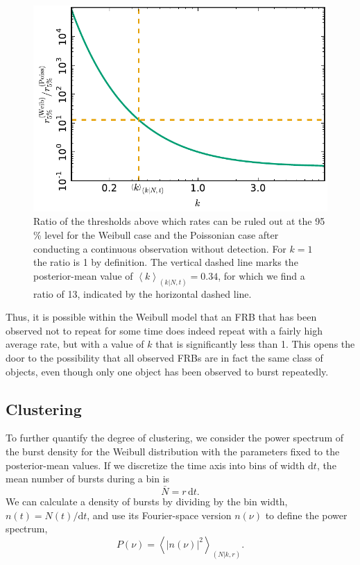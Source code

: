 \documentclass[fleqn,usenatbib]{mnras}
\newcommand{\new}[1]{#1}
\begin{document}
\begin{figure}
	\includegraphics[width=1.0\columnwidth]{rule_out_rate.pdf}
	\caption{\label{fig:ruleout}\new{Ratio of the thresholds above which rates can be ruled out at the 95\,\% level for the Weibull case and the Poissonian case after conducting a continuous observation without detection. For $k = 1$ the ratio is 1 by definition. The vertical dashed line marks the posterior-mean value of $\left<k\right>_{(k|N,t)}=0.34$, for which we find a ratio of 13, indicated by the horizontal dashed line.}}
\end{figure}

\new{Thus, it is possible within the Weibull model that an FRB that has been observed not to repeat for some time does indeed repeat with a fairly high average rate, but with a value of $k$ that is significantly less than 1. This opens the door to the possibility that all observed FRBs are in fact the same class of objects, even though only one object has been observed to burst repeatedly.}


\subsection{Clustering}
\label{sec:clustering}

\new{To further quantify the degree of clustering, we consider the power spectrum of the burst density for the Weibull distribution with the parameters fixed to the posterior-mean values. If we discretize the time axis into bins of width $\mathrm{d}t$, the mean number of bursts during a bin is
\begin{equation}
	\bar{N} = r\,\mathrm{d}t.
\end{equation}
We can calculate a density of bursts by dividing by the bin width, $n(t) = N(t)/\mathrm{d}t$, and use its Fourier-space version $n(\nu)$ to define the power spectrum,
\begin{equation}
	P(\nu) = \left< \left|n(\nu)\right|^2 \right>_{(N|k,r)}.
\end{equation}}
\end{document}
